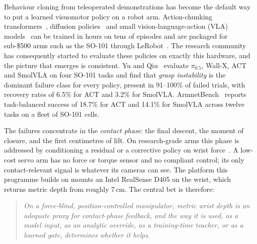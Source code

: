 \documentclass[11pt,a4paper]{article}
\theoremstyle{definition}
\begin{document}
Behaviour cloning from teleoperated demonstrations has become the default way to put a learned visuomotor policy on a robot arm. Action-chunking transformers~\citep{zhao2023act}, diffusion policies~\citep{chi2023diffusion} and small vision-language-action (VLA) models~\citep{shukor2025smolvla} can be trained in hours on tens of episodes and are packaged for sub-\$500 arms such as the SO-101 through LeRobot~\citep{cadene2024lerobot}. The research community has consequently started to evaluate these policies on exactly this hardware, and the picture that emerges is consistent. Yu and Qiu~\citep{yu2026so101} evaluate $\pi_{0.5}$, Wall-X, ACT and SmolVLA on four SO-101 tasks and find that \emph{grasp instability} is the dominant failure class for every policy, present in 91--100\% of failed trials, with recovery rates of 6.5\% for ACT and 3.2\% for SmolVLA. ArmnetBench~\citep{armnetbench2026} reports task-balanced success of 18.7\% for ACT and 14.1\% for SmolVLA across twelve tasks on a fleet of SO-101 cells.

The failures concentrate in the \emph{contact phase}: the final descent, the moment of closure, and the first centimetres of lift. On research-grade arms this phase is addressed by conditioning a residual or a corrective policy on wrist force~\citep{xu2025crdagger,forcerft2026,luo2024hilserl}. A low-cost servo arm has no force or torque sensor and no compliant control; its only contact-relevant signal is whatever its cameras can see. The platform this programme builds on mounts an Intel RealSense D405 on the wrist, which returns metric depth from roughly 7\,cm. The central bet is therefore:

\begin{quote}\itshape
On a force-blind, position-controlled manipulator, metric wrist depth is an adequate proxy for contact-phase feedback, and the way it is used, as a model input, as an analytic override, as a training-time teacher, or as a learned gate, determines whether it helps.
\end{quote}
\end{document}
